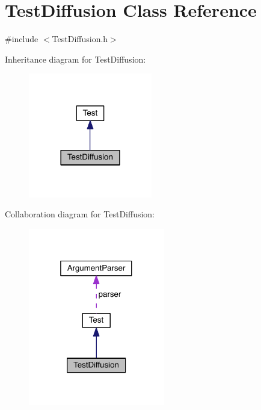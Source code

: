 \hypertarget{class_test_diffusion}{}\section{Test\+Diffusion Class Reference}
\label{class_test_diffusion}


{\ttfamily \#include $<$Test\+Diffusion.\+h$>$}



Inheritance diagram for Test\+Diffusion\+:\nopagebreak
\begin{figure}[H]
\begin{center}
\leavevmode
\includegraphics[width=153pt]{d3/d39/class_test_diffusion__inherit__graph}
\end{center}
\end{figure}


Collaboration diagram for Test\+Diffusion\+:\nopagebreak
\begin{figure}[H]
\begin{center}
\leavevmode
\includegraphics[width=169pt]{d4/d59/class_test_diffusion__coll__graph}
\end{center}
\end{figure}
